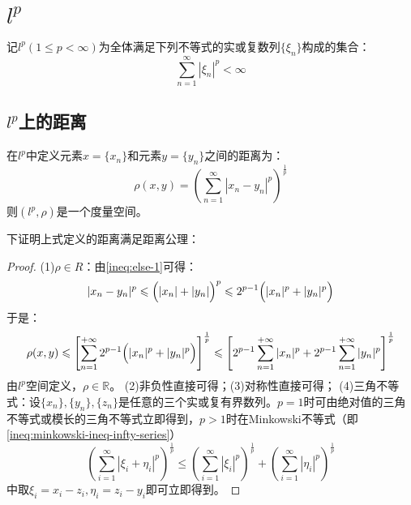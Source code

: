 \section{$l^p$}

\begin{definition}
	记$l^p(1\leqslant p<\infty)$为全体满足下列不等式的实或复数列$\{\xi_n\}$构成的集合：
	\begin{equation*}
		\sum_{n=1}^{\infty}|\xi_n|^p<\infty
	\end{equation*}
\end{definition}

\subsection{$l^p$上的距离}
\begin{definition}
	在$l^p$中定义元素$x=\{x_n\}$和元素$y=\{y_n\}$之间的距离为：
	\begin{equation*}
		\rho(x,y)=\left(\sum_{n=1}^{\infty}|x_n-y_n|^p\right)^\frac{1}{p}
	\end{equation*}
	则$(l^p,\rho)$是一个度量空间。
\end{definition}
下证明上式定义的距离满足距离公理：
\begin{proof}
	(1)$\rho\in R$：由\cref{ineq:else-1}可得：
	\begin{equation*}
		|x_n-y_n|^p\leqslant\Bigl(|x_n|+|y_n|\Bigr)^p\leqslant2^{p-1}\Bigl(|x_n|^p+|y_n|^p\Bigr)
	\end{equation*}
	于是：
	\begin{equation*}
		\rho(x,y)\leqslant\left[\sum_{n=1}^{+\infty}2^{p-1}\Bigl(|x_n|^p+|y_n|^p\Bigr)\right]^{\frac{1}{p}}\leqslant\left[2^{p-1}\sum_{n=1}^{+\infty}|x_n|^p+2^{p-1}\sum_{n=1}^{+\infty}|y_n|^p\right]^{\frac{1}{p}}
	\end{equation*}
	由$l^p$空间定义，$\rho\in\mathbb{R}$。
	(2)非负性直接可得；(3)对称性直接可得；
	(4)三角不等式：设$\{x_n\},\{y_n\},\{z_n\}$是任意的三个实或复有界数列。$p=1$时可由绝对值的三角不等式或模长的三角不等式立即得到，$p>1$时在Minkowski不等式（即\cref{ineq:minkowski-ineq-infty-series}）
	\begin{equation*}
		\left(\sum_{i=1}^\infty|\xi_i+\eta_i|^p\right)^\frac{1}{p}\leqslant\left(\sum_{i=1}^\infty|\xi_i|^p\right)^\frac{1}{p}+\left(\sum_{i=1}^\infty|\eta_i|^p\right)^\frac{1}{p}
	\end{equation*}
	中取$\xi_i=x_i-z_i,\eta_i=z_i-y_i$即可立即得到。
\end{proof}

